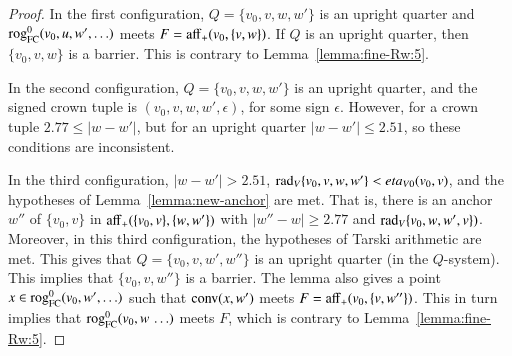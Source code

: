 \begin{proof}
In the first configuration, $Q=\{v_0,v,w,w'\}$ is an upright quarter and
${\operatorname{rog}}^0_{\text{FC}}(v_0,u,w',\ldots)$ meets $F = {\operatorname{aff}}_+(v_0,\{v,w\})$.  If $Q$ is an upright
quarter, then $\{v_0,v,w\}$ is a barrier.  This is contrary to Lemma~\ref{lemma:fine-Rw:5}.

In the second configuration, $Q=\{v_0,v,w,w'\}$ is an upright quarter, and the signed crown
tuple is $(v_0,v,w,w',\epsilon)$, for some sign $\epsilon$.  However, for a crown
tuple $2.77\le |w-w'|$, but for an upright quarter $|w-w'|\le 2.51$, so these conditions
are inconsistent.

In the third configuration, $|w-w'| > 2.51$, ${\operatorname{rad}}_V\{v_0,v,w,w'\} < eta_{V0}(v_0,v)$,
and the hypotheses of Lemma~\ref{lemma:new-anchor} are met.  That is, there is an anchor
$w''$ of $\{v_0,v\}$ in ${\operatorname{aff}}_+(\{v_0,v\},\{w,w'\})$ with $|w''-w|\ge 2.77$
and $\operatorname{rad}_V\{v_0,w,w',v\})$.  Moreover, in this third configuration, the hypotheses of
Tarski arithmetic are met.  This gives that $Q=\{v_0,v,w',w''\}$ is an upright
quarter (in the $Q$-system).  This implies that $\{v_0,v,w''\}$ is a barrier.  The lemma
also gives a point $x \in {\operatorname{rog}}^0_{\text{FC}}(v_0,w',\ldots)$ such that ${\operatorname{conv}}(x,w')$ meets
$F={\operatorname{aff}}_+(v_0,\{v,w''\})$.  This in turn implies that ${\operatorname{rog}}^0_{\text{FC}}(v_0,w\,\ldots)$ meets $F$,
which is contrary to Lemma~\ref{lemma:fine-Rw:5}.
%
%
%
\end{proof}



